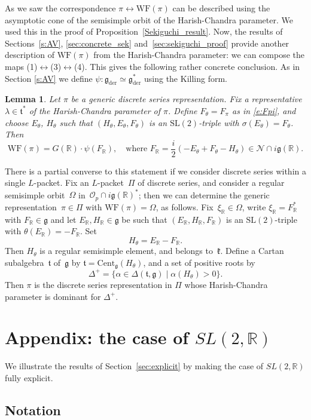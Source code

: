 \documentclass[10pt,leqno]{article}
\newtheorem{lemma}[equation]{Lemma}
\numberwithin{equation}{section}
\newcommand{\Cent}{\mathrm{Cent}}
\renewcommand{\O}{\mathcal O}
\newcommand{\R}{\mathbb R}
\newcommand{\N}{\mathcal N}
\renewcommand{\k}{\mathfrak k}
\renewcommand{\t}{\mathfrak t}
\newcommand{\g}{\mathfrak g}
\newcommand{\gder}{\mathfrak g_{\mathrm{der}}}
\newcommand{\WF}{\mathrm{WF}}
\newcommand{\Op}{\O_p}
\begin{document}
As we saw the correspondence $\pi \leftrightarrow \WF(\pi)$ can be described using the asymptotic cone of the semisimple orbit of the Harish-Chandra parameter. We used this in the proof of Proposition~\ref{Sekiguchi_result}. Now, the results of Sections~\ref{s:AV}, \ref{sec:concrete_sek} and~\ref{sec:sekiguchi_proof} provide another description of $\WF(\pi)$ from the Harish-Chandra parameter: we can compose the maps (1)$\leftrightarrow$(3)$\leftrightarrow$(4). This gives the following rather concrete conclusion.
As in Section \ref{s:AV} we define $\psi:\gder\simeq \gder^*$ using the Killing form.  

\begin{lemma}\label{lem:explicit_WF}
  Let $\pi$ be a generic discrete series representation. Fix a representative  $\lambda\in \t^*$ of the Harish-Chandra parameter of $\pi$.
Define $F_\theta=F_\pi$ as in \eqref{e:Fpi}, and choose  $E_\theta$, $H_\theta$ such that $(H_\theta,E_\theta,F_\theta)$ is an $\mathrm{SL}(2)$-triple with $\sigma(E_\theta)=F_\theta$.  Then
$$
\WF(\pi)=G(\R)\cdot \psi(F_\R), \quad \text{where $F_\R = \frac i2(-E_\theta+F_\theta-H_\theta)\in\N\cap i\g(\R)$.}
$$\end{lemma}
There is a partial converse to this statement if we consider discrete series within a single $L$-packet. Fix an $L$-packet~$\Pi$ of discrete series, and consider a regular semisimple orbit~$\Omega$ in~$\Op \cap i\g(\R)^\ast$; then we can determine the generic representation~$\pi \in \Pi$ with $\WF(\pi)=\Omega$, as follows. Fix~$\xi_\R \in \Omega$, write $\xi_\R=F_\R^\ast$ with $F_\R \in \g$ and let $E_\R, H_\R \in \g$ be such that $(E_\R, H_\R, F_\R)$ is an  $\mathrm{SL}(2)$-triple with $\theta(E_\R)=-F_\R$. Set
$$
H_\theta=E_\R-F_\R.
$$
Then $H_\theta$ is a regular semisimple element, and belongs to~$\k$.
Define a Cartan subalgebra~$\t$ of~$\g$ by $\t=\Cent_{\g}(H_\theta)$, and a set of positive roots by
$$
\Delta^+=\{\alpha\in\Delta(\t,\g)\mid  \alpha(H_\theta)>0\}.
$$
Then $\pi$ is the discrete series representation in $\Pi$ whose Harish-Chandra parameter is dominant for $\Delta^+$. 

\section{Appendix: the case of $SL(2,\R)$}

We illustrate the results of Section~\ref{sec:explicit} by making the case of $SL(2,\R)$ fully explicit.

\subsection{Notation}
\end{document}
